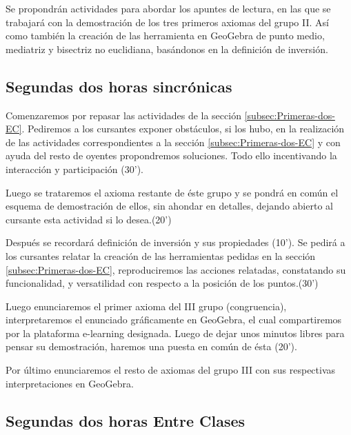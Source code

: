 \documentclass[oneside,spanish]{amsart}
\numberwithin{equation}{section}
\numberwithin{figure}{section}
\theoremstyle{definition}
\begin{document}
Se propondrán actividades para abordar los apuntes de lectura, en las que se trabajará con la demostración de los tres primeros axiomas del grupo II. Así como también la creación de las herramienta en GeoGebra de punto medio, mediatriz y bisectriz no euclidiana, basándonos en la definición de inversión.\textasciiacute{}

\subsection{Segundas dos horas sincrónicas\label{subsec:Segundas-dos-sinc}}

Comenzaremos por repasar las actividades de la sección \ref{subsec:Primeras-dos-EC}. Pediremos a los cursantes exponer obstáculos, si los hubo, en la realización de las actividades correspondientes a la sección \ref{subsec:Primeras-dos-EC} y con ayuda del resto de oyentes propondremos soluciones. Todo ello incentivando la interacción y participación (30'). 

Luego se trataremos el axioma restante de éste grupo y se pondrá en común el esquema de demostración de ellos, sin ahondar en detalles, dejando abierto al cursante esta actividad si lo desea.(20')

Después se recordará definición de inversión y sus propiedades (10'). Se pedirá a los cursantes relatar la creación de las herramientas pedidas en la sección \ref{subsec:Primeras-dos-EC}, reproduciremos las acciones relatadas, constatando su funcionalidad, y versatilidad con respecto a la posición de los puntos.(30')

Luego enunciaremos el primer axioma del III grupo (congruencia), interpretaremos el enunciado gráficamente en GeoGebra, el cual compartiremos por la plataforma e-learning designada. Luego de dejar unos minutos libres para pensar su demostración, haremos una puesta en común de ésta (20'). 

Por último enunciaremos el resto de axiomas del grupo III con sus respectivas interpretaciones en GeoGebra.

\subsection{Segundas dos horas Entre Clases\label{subsec:Segundas-dos-EC}}
\end{document}

